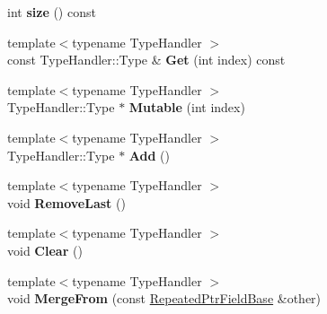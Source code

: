 \begin{DoxyCompactItemize}
int {\bfseries size} () const
\item 
\mbox{\label{classgoogle_1_1protobuf_1_1internal_1_1RepeatedPtrFieldBase_af86847aa2dd9fff9aa579f79b47789d1}} 
{\footnotesize template$<$typename Type\+Handler $>$ }\\const Type\+Handler\+::\+Type \& {\bfseries Get} (int index) const
\item 
\mbox{\label{classgoogle_1_1protobuf_1_1internal_1_1RepeatedPtrFieldBase_aed7f44ab155046759d25bd3a74778844}} 
{\footnotesize template$<$typename Type\+Handler $>$ }\\Type\+Handler\+::\+Type $\ast$ {\bfseries Mutable} (int index)
\item 
\mbox{\label{classgoogle_1_1protobuf_1_1internal_1_1RepeatedPtrFieldBase_ac411555d0e149919604435255558823d}} 
{\footnotesize template$<$typename Type\+Handler $>$ }\\Type\+Handler\+::\+Type $\ast$ {\bfseries Add} ()
\item 
\mbox{\label{classgoogle_1_1protobuf_1_1internal_1_1RepeatedPtrFieldBase_aabdf22f7d2a055f5006151d2dd8730ef}} 
{\footnotesize template$<$typename Type\+Handler $>$ }\\void {\bfseries Remove\+Last} ()
\item 
\mbox{\label{classgoogle_1_1protobuf_1_1internal_1_1RepeatedPtrFieldBase_a0626134120038606dcd3daf3e4111d0c}} 
{\footnotesize template$<$typename Type\+Handler $>$ }\\void {\bfseries Clear} ()
\item 
\mbox{\label{classgoogle_1_1protobuf_1_1internal_1_1RepeatedPtrFieldBase_a5c8019b9fda108ee3baae89916b9bd2b}} 
{\footnotesize template$<$typename Type\+Handler $>$ }\\void {\bfseries Merge\+From} (const \hyperlink{classgoogle_1_1protobuf_1_1internal_1_1RepeatedPtrFieldBase}{Repeated\+Ptr\+Field\+Base} \&other)
\item 

\end{DoxyCompactItemize}
